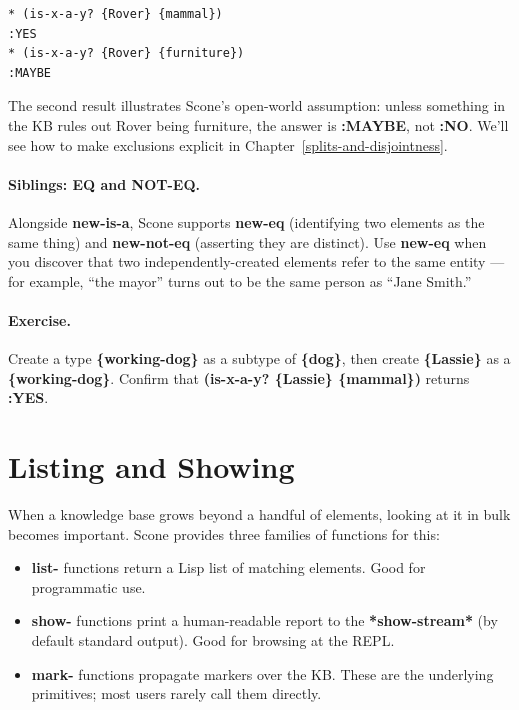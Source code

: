 \documentclass[titlepage,twoside,openright,11pt]{article}
\begin{document}
\begin{verbatim}
* (is-x-a-y? {Rover} {mammal})
:YES
* (is-x-a-y? {Rover} {furniture})
:MAYBE
\end{verbatim}

The second result illustrates Scone's open-world assumption: unless
something in the KB rules out Rover being furniture, the answer is
\textbf{:MAYBE}, not \textbf{:NO}. We'll see how to make exclusions
explicit in Chapter~\ref{splits-and-disjointness}.

\paragraph{Siblings: EQ and NOT-EQ.}
Alongside \textbf{new-is-a}, Scone supports \textbf{new-eq}
(identifying two elements as the same thing) and \textbf{new-not-eq}
(asserting they are distinct). Use \textbf{new-eq} when you discover
that two independently-created elements refer to the same entity
--- for example, ``the mayor'' turns out to be the same person as
``Jane Smith.''

\paragraph{Exercise.}
Create a type \textbf{\{working-dog\}} as a subtype of
\textbf{\{dog\}}, then create \textbf{\{Lassie\}} as a
\textbf{\{working-dog\}}. Confirm that \textbf{(is-x-a-y?
\{Lassie\} \{mammal\})} returns \textbf{:YES}.

\section{Listing and Showing}\label{listing-and-showing}

When a knowledge base grows beyond a handful of elements, looking at
it in bulk becomes important. Scone provides three families of
functions for this:

\begin{itemize}
\item
  \textbf{list-} functions return a Lisp list of matching elements.
  Good for programmatic use.
\item
  \textbf{show-} functions print a human-readable report to the
  \textbf{*show-stream*} (by default standard output). Good for
  browsing at the REPL.
\item
  \textbf{mark-} functions propagate markers over the KB. These are
  the underlying primitives; most users rarely call them directly.
\end{itemize}
\end{document}
